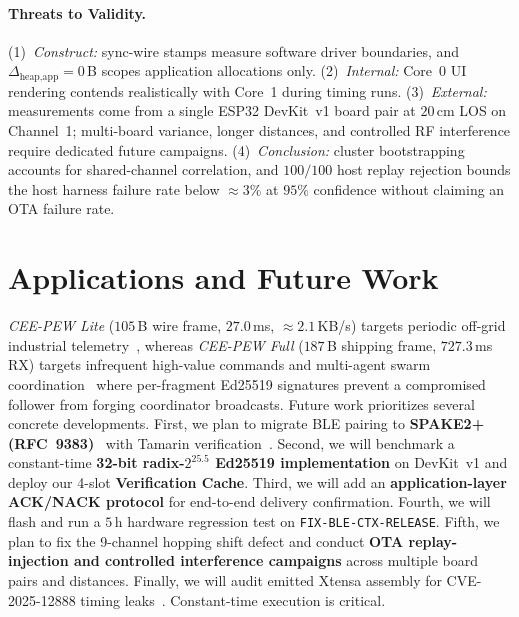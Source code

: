 \documentclass[conference]{IEEEtran}
\begin{document}
\paragraph{Threats to Validity.} (1)~\textit{Construct:} sync-wire stamps measure software driver boundaries, and $\Delta_{\text{heap,app}}=0$\,B scopes application allocations only. (2)~\textit{Internal:} Core~0 UI rendering contends realistically with Core~1 during timing runs. (3)~\textit{External:} measurements come from a single ESP32 DevKit~v1 board pair at $20$\,cm LOS on Channel~1; multi-board variance, longer distances, and controlled RF interference require dedicated future campaigns. (4)~\textit{Conclusion:} cluster bootstrapping accounts for shared-channel correlation, and $100/100$ host replay rejection bounds the host harness failure rate below $\approx 3\%$ at $95\%$ confidence without claiming an OTA failure rate.

\section{Applications and Future Work}\label{sec:future}\label{sec:swarm}
\textit{CEE-PEW Lite} ($105$\,B wire frame, $27.0$\,ms, $\approx 2.1$\,KB/s) targets periodic off-grid industrial telemetry~\cite{montiel2026,urazayev2023}, whereas \textit{CEE-PEW Full} ($187$\,B shipping frame, $727.3$\,ms RX) targets infrequent high-value commands and multi-agent swarm coordination~\cite{caniago2026} where per-fragment Ed25519 signatures prevent a compromised follower from forging coordinator broadcasts. Future work prioritizes several concrete developments. First, we plan to migrate BLE pairing to \textbf{SPAKE2+ (RFC~9383)}~\cite{rfc9383} with Tamarin verification~\cite{vanderlinden2023}. Second, we will benchmark a constant-time \textbf{32-bit radix-$2^{25.5}$ Ed25519 implementation} on DevKit~v1 and deploy our 4-slot \textbf{Verification Cache}. Third, we will add an \textbf{application-layer ACK/NACK protocol} for end-to-end delivery confirmation. Fourth, we will flash and run a $5$\,h hardware regression test on \texttt{FIX-BLE-CTX-RELEASE}. Fifth, we plan to fix the 9-channel hopping shift defect and conduct \textbf{OTA replay-injection and controlled interference campaigns} across multiple board pairs and distances. Finally, we will audit emitted Xtensa assembly for CVE-2025-12888 timing leaks~\cite{cve2025_12888}. Constant-time execution is critical.
\end{document}
